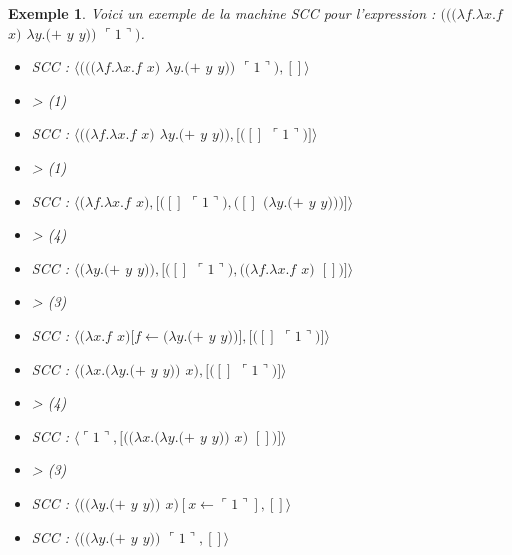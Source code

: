 \documentclass[10pt,a4paper]{report}
\newtheorem{ex}{Exemple}
\begin{document}
\begin{ex}
	Voici un exemple de la machine SCC pour l'expression : $(((\lambda f.\lambda x.f$ $x)$ $\lambda y.(+$ $y$ $y))$ $\ulcorner 1\urcorner)$.
	
	\begin{multicols}{2}\raggedright{
			\begin{itemize}
				\item[] SCC : $\langle(((\lambda f.\lambda x.f$ $x)$ $\lambda y.(+$ $y$ $y))$ $\ulcorner 1\urcorner),[]\rangle$
				\item[] > (1)
				\item[] SCC : $\langle((\lambda f.\lambda x.f$ $x)$ $\lambda y.(+$ $y$ $y)),[([]$ $\ulcorner 1\urcorner)]\rangle$
				\item[] > (1)
				\item[] SCC : $\langle(\lambda f.\lambda x.f$ $x),[([]$ $\ulcorner 1\urcorner),([]$ $(\lambda y.(+$ $y$ $y)))]\rangle$
				\item[] > (4)
				\item[] SCC : $\langle(\lambda y.(+$ $y$ $y)),[([]$ $\ulcorner 1\urcorner),((\lambda f.\lambda x.f$ $x)$ $[])]\rangle$
				\item[] > (3) 
				\item[] SCC : $\langle(\lambda x.f$ $x)[f\leftarrow(\lambda y.(+$ $y$ $y))],[([]$ $\ulcorner 1\urcorner)]\rangle$
				\item[] SCC : $\langle(\lambda x.(\lambda y.(+$ $y$ $y))$ $x),[([]$ $\ulcorner 1\urcorner)]\rangle$
				\item[] > (4) 
				\item[] SCC : $\langle\ulcorner 1\urcorner,[((\lambda x.(\lambda y.(+$ $y$ $y))$ $x)$ $[])]\rangle$
				\item[] > (3) 
				\item[] SCC : $\langle((\lambda y.(+$ $y$ $y))$ $x)[x \leftarrow\ulcorner 1\urcorner],[]\rangle$
				\item[] SCC : $\langle((\lambda y.(+$ $y$ $y))$ $\ulcorner 1\urcorner,[]\rangle$
			\end{itemize}
			
}
\end{multicols}
\end{ex}
\end{document}
